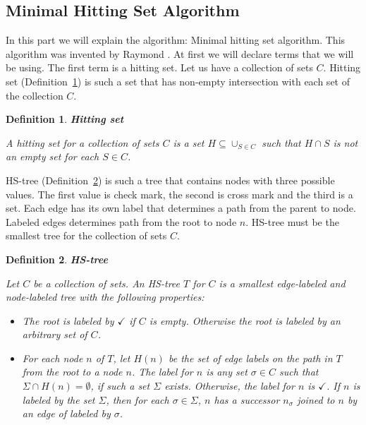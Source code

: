\documentclass[12pt,a4paper]{article}
\newtheorem{definition}{Definition}[subsection]
\begin{document}
\subsection{Minimal Hitting Set Algorithm}
In this part we will explain the algorithm: Minimal hitting set algorithm. This algorithm was invented by Raymond \cite{reiterHS}. At first we will declare terms that we will be using. The first term is a hitting set. Let us have a collection of sets $C$. Hitting set (Definition~\ref{def:hittingSet}) is such a set that has non-empty intersection with each set of the collection $C$.

\begin{definition}{\textbf{Hitting set}}
	\label{def:hittingSet}
	
	A hitting set for a collection of sets $C$ is a set $H \subseteq \cup_{S \in C}$ such that $H \cap S$ is not an empty set for each $S \in C$.
\end{definition}

HS-tree (Definition~\ref{def:hsTree}) is such a tree that contains nodes with three possible values. The first value is check mark, the second is cross mark and the third is a set. Each edge has its own label that determines a path from the parent to node. Labeled edges determines path from the root to node $n$. HS-tree must be the smallest tree for the collection of sets $C$.

\begin{definition}{\textbf{HS-tree}}
	\label{def:hsTree}
	
	Let $C$ be a collection of sets. An HS-tree $T$ for $C$ is a smallest edge-labeled and node-labeled tree with the following properties:
	
	\begin{itemize}
		\item The root is labeled by $\checkmark$ if $C$ is empty. Otherwise the root is labeled by an arbitrary set of $C$.
		
		\item For each node $n$ of $T$, let $H(n)$ be the set of edge labels on the path in $T$ from the root to a node $n$. The label for $n$ is any set $\sigma \in C$ such that $\Sigma \cap H(n) = \emptyset$, if such a set $\Sigma$ exists. Otherwise, the label for $n$ is $\checkmark$. If $n$ is labeled by the set $\Sigma$, then for each $\sigma \in \Sigma$, $n$ has a successor $n_{\sigma}$ joined to $n$ by an edge of labeled by $\sigma$.
	\end{itemize}
\end{definition}
\end{document}
